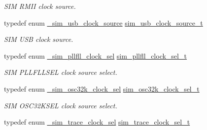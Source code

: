 \begin{DoxyCompactItemize}
\begin{DoxyCompactList}\small\item\em S\+IM R\+M\+II clock source. \end{DoxyCompactList}\item 
typedef enum \hyperlink{group__sim__hal_ga08e8c635a2a5739f0ce629cd15410a7b}{\+\_\+sim\+\_\+usb\+\_\+clock\+\_\+source} \hyperlink{group__sim__hal_ga28b4cb9340155e307b41f967235d3cc6}{sim\+\_\+usb\+\_\+clock\+\_\+source\+\_\+t}\hypertarget{group__sim__hal_ga28b4cb9340155e307b41f967235d3cc6}{}\label{group__sim__hal_ga28b4cb9340155e307b41f967235d3cc6}

\begin{DoxyCompactList}\small\item\em S\+IM U\+SB clock source. \end{DoxyCompactList}\item 
typedef enum \hyperlink{group__sim__hal_gac50cdfb7351b61de041d031eb0c3bcfc}{\+\_\+sim\+\_\+pllfll\+\_\+clock\+\_\+sel} \hyperlink{group__sim__hal_gac8f034a36dcf79fb7fd4fec1f6d84f1a}{sim\+\_\+pllfll\+\_\+clock\+\_\+sel\+\_\+t}\hypertarget{group__sim__hal_gac8f034a36dcf79fb7fd4fec1f6d84f1a}{}\label{group__sim__hal_gac8f034a36dcf79fb7fd4fec1f6d84f1a}

\begin{DoxyCompactList}\small\item\em S\+IM P\+L\+L\+F\+L\+L\+S\+EL clock source select. \end{DoxyCompactList}\item 
typedef enum \hyperlink{group__sim__hal_ga53eab0504e5f90d3f35a8cdd41aff069}{\+\_\+sim\+\_\+osc32k\+\_\+clock\+\_\+sel} \hyperlink{group__sim__hal_gade426197a221be9ffa447f892f129cdd}{sim\+\_\+osc32k\+\_\+clock\+\_\+sel\+\_\+t}\hypertarget{group__sim__hal_gade426197a221be9ffa447f892f129cdd}{}\label{group__sim__hal_gade426197a221be9ffa447f892f129cdd}

\begin{DoxyCompactList}\small\item\em S\+IM O\+S\+C32\+K\+S\+EL clock source select. \end{DoxyCompactList}\item 
typedef enum \hyperlink{group__sim__hal_gaadc91652066cea42d44889e57aa74bca}{\+\_\+sim\+\_\+trace\+\_\+clock\+\_\+sel} \hyperlink{group__sim__hal_ga8ed73418d808c98e30c9ac0f2f015861}{sim\+\_\+trace\+\_\+clock\+\_\+sel\+\_\+t}\hypertarget{group__sim__hal_ga8ed73418d808c98e30c9ac0f2f015861}{}\label{group__sim__hal_ga8ed73418d808c98e30c9ac0f2f015861}


\end{DoxyCompactItemize}
